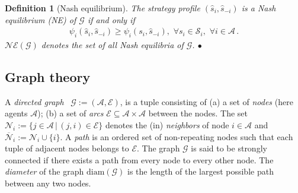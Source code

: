 \documentclass{IEEEtran}
\newcommand{\ldef}{:=}
\newcommand{\Mcal}[1]{\mathcal{#1}}
\newcommand{\Mc}[1]{\mathcal{#1}}
\newtheorem{define}[theorem]{Definition}
\newcommand{\bulletsym}{\hbox{$\bullet$}}
\newcommand{\bulletend}{\relax\ifmmode\else\unskip\hfill\fi\bulletsym}
\renewcommand{\hat}[1]{\widehat{#1}}
\renewcommand{\bar}[1]{\overline{#1}}
\newcommand{\marginn}[1]{\marginpar{\color{blue}\tiny\ttfamily#1}}
\newcommand{\margin}[1]{\marginpar{\color{magenta}\tiny\ttfamily#1}}
\def \agt{\Mcal{A}}
\def \diam{\mathrm{diam}}
\def \edg{\Mcal{E}}
\def \game{\mathscr{G}}
\def \grph{\Mcal{G}}
\def \ne{\Mc{NE}}
\def \neigh{\Mc{N}}
\def \neighb{\bar{\Mc{N}}}
\def \S{\Mc{S}}
\begin{document}
\begin{define}[Nash equilibrium]
\label{def:ne}
The strategy profile $(\hat{s}_i,\hat{s}_{-i})$ is a Nash equilibrium
(NE) of $\game$ if and only if
\begin{align*}
	\psi_i(\hat{s}_i,\hat{s}_{-i}) \geq \psi_i(s_i,\hat{s}_{-i}), \,\, \forall s_i \in \S_i, \,\, \forall i \in \agt\,. 
\end{align*}
$\ne(\game)$ denotes the set of all Nash equilibria of $\game$.
\bulletend
\end{define}

\subsection{Graph theory}
A \emph{directed graph}~\cite{RD:17}
$\grph \ldef (\agt,\edg)$, is a tuple consisting of (a)  a set of \emph{nodes} (here agents $\agt$); (b) a set of \emph{arcs} $\edg \subseteq \agt \times \agt$ between the nodes.
The set $\neigh_i \ldef \{ j \in \agt \,|\, (j,i) \in \edg\}$ denotes the (in) \emph{neighbors} of node $i \in \agt$ and $\neighb_i \ldef \neigh_i \cup \{i\}$. A \emph{path} is an ordered set of non-repeating nodes such that each tuple of adjacent nodes belongs to $\edg$. The graph $\grph$ is said to be strongly connected if there exists a path from every node to every other node. The \emph{diameter} of the graph $\diam(\grph)$ is the length of the largest possible path between any two nodes.
\end{document}
